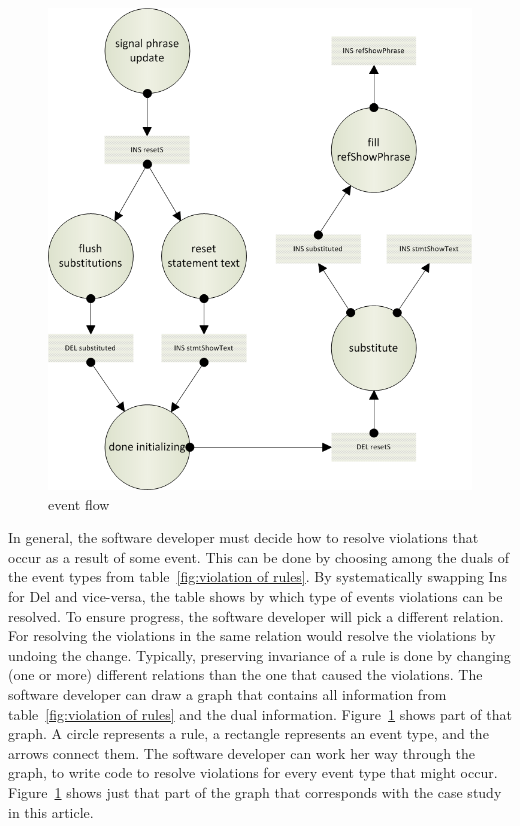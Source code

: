 \documentclass{svproc}
\begin{document}
\begin{figure}[bht]
\begin{center}
  \includegraphics[scale=.55]{eventFlow.png}
\end{center}
\caption{event flow}
\label{fig:event flow}
\end{figure}
	In general, the software developer must decide how to resolve violations that occur as a result of some event.
	This can be done by choosing among the duals of the event types from table~\ref{fig:violation of rules}.
	By systematically swapping Ins for Del and vice-versa,
	the table shows by which type of events violations can be resolved.
	To ensure progress, the software developer will pick a different relation.
	For resolving the violations in the same relation would resolve the violations by undoing the change.
        Typically, preserving invariance of a rule is done by changing (one or more) different relations than the one that caused the violations.
	The software developer can draw a graph that contains all information from table~\ref{fig:violation of rules}
	and the dual information.
	Figure~\ref{fig:event flow} shows part of that graph.
	A circle represents a rule, a rectangle represents an event type, and the arrows connect them.
	The software developer can work her way through the graph, to write code to resolve violations for every event type that might occur.
	Figure~\ref{fig:event flow} shows just that part of the graph that corresponds with the case study in this article.
\end{document}
